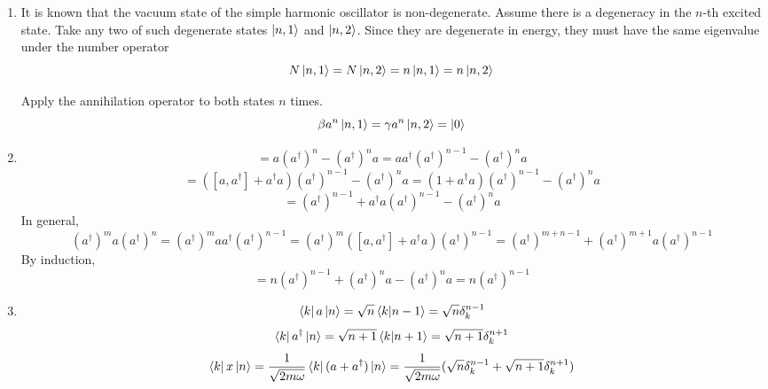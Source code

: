 \begin{sol}
\begin{enumerate}[label=\textbf{(\alph*)}]
\item
It is known that the vacuum state of the simple harmonic oscillator is non-degenerate. Assume there is a degeneracy in the $n$-th excited state. Take any two of such degenerate states $\ket{n,1}$ and $\ket{n,2}$. Since they are degenerate in energy, they must have the same eigenvalue under the number operator
\begin{equation}
	N\ket{n,1}=N\ket{n,2}=n\ket{n,1}=n\ket{n,2}
\end{equation}

Apply the annihilation operator to both states $n$ times.
\begin{equation}
	\beta a^n\ket{n,1}=\gamma a^n\ket{n,2}=\ket 0
\end{equation} 
\item
\begin{equation}
	[a,(a^\dagger)^n]=a(a^\dagger)^n-(a^\dagger)^na=aa^\dagger(a^\dagger)^{n-1}-(a^\dagger)^na
\end{equation} \begin{equation}
	=([a,a^\dagger]+a^\dagger a)(a^\dagger)^{n-1}-(a^\dagger)^na=(1+a^\dagger a)(a^\dagger)^{n-1}-(a^\dagger)^na
\end{equation}
\begin{equation}
	=(a^\dagger)^{n-1}+a^\dagger a(a^\dagger)^{n-1}-(a^\dagger)^na
\end{equation} 
In general, 
\begin{equation}
	(a^\dagger)^ma(a^\dagger)^n=(a^\dagger)^maa^\dagger(a^\dagger)^{n-1}=(a^\dagger)^{m}([a,a^\dagger]+a^\dagger a)(a^\dagger)^{n-1}=(a^\dagger)^{m+n-1}+(a^\dagger)^{m+1}a(a^\dagger)^{n-1}
\end{equation}
By induction, 
\begin{equation}
	[a,(a^\dagger)^n]=n(a^\dagger)^{n-1}+(a^\dagger)^na-(a^\dagger)^na=n(a^\dagger)^{n-1}
\end{equation} 
\item
\begin{equation}
	\bra ka\ket n=\sqrt n\braket{k}{n-1}=\sqrt n\delta_k^{n-1}
\end{equation} 
\begin{equation}
	\bra ka^\dagger\ket n=\sqrt{n+1}\braket{k}{n+1}=\sqrt{n+1}\delta_k^{n+1}
\end{equation}
\begin{equation}
	\bra kx\ket n=\frac{1}{\sqrt{2m\omega}}\bra k(a+a^\dagger)\ket n=\frac{1}{\sqrt{2m\omega}}(\sqrt n\delta_k^{n-1}+\sqrt{n+1}\delta_k^{n+1})
\end{equation}


\end{enumerate}
\end{sol}
